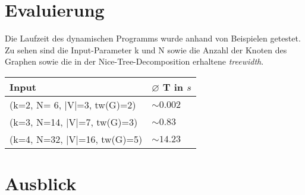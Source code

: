 \section{Evaluierung}
\label{sec:eval}
Die Laufzeit des dynamischen Programms wurde anhand von Beispielen getestet. Zu sehen sind die Input-Parameter k und N sowie die Anzahl der Knoten des Graphen sowie die in der Nice-Tree-Decomposition erhaltene \textit{treewidth}.
\begin{table}
\centering
\begin{tabular}{l | l} 
\textbf{Input} & \textbf{ $\varnothing$ T in $s$}\\
\hline
(k=2, N= 6, |V|=3, tw(G)=2) & $ \sim 0.002$ \\
(k=3, N=14, |V|=7, tw(G)=3) & $ \sim 0.83$ \\
(k=4, N=32, |V|=16, tw(G)=5) & $ \sim 14.23$ \\
\end{tabular}
\end{table}

\section{Ausblick}
\label{sec:outlook}
